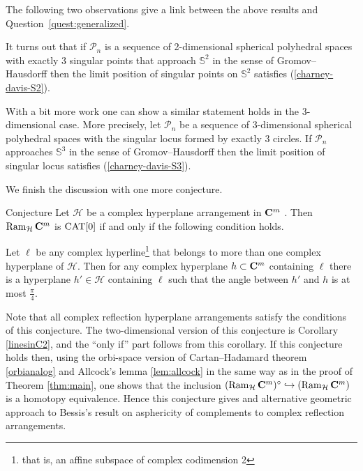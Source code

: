 \documentclass{compositio}
\begin{document}
The following two observations give a link between the above results and Question~\ref{quest:generalized}.

It turns out that if $\mathcal{P}_n$ is a sequence of 2-dimensional spherical polyhedral spaces with exactly 3 singular points that approach $\mathbb{S}^2$ in the sense of Gromov--Hausdorff then
the limit position of singular points on $\mathbb{S}^2$ satisfies (\ref{charney-davis-S2}).

With a bit more work one can show a similar statement holds in the 3-dimensional case.
More precisely, let $\mathcal{P}_n$ be a sequence of 3-dimensional spherical polyhedral spaces with the singular locus formed by exactly 3 circles.
If $\mathcal{P}_n$ approaches $\mathbb{S}^3$ in the sense of Gromov--Hausdorff then the limit position of singular locus  satisfies (\ref{charney-davis-S3}).

We finish the discussion with one more conjecture.

\begin{thm}{Conjecture} Let $\mathcal H$ be
a complex hyperplane arrangement in $\mathbf{C}^m$ . Then  $\mathop{\rm Ram}\nolimits_{\mathcal H} \mathbf{C}^m$ is $\mathrm{CAT}[0]$
if and only if the following condition holds.

Let $\ell$ be any complex hyperline\footnote{that is, an affine subspace of complex codimension 2}
that belongs to more than one complex hyperplane of $\mathcal H$.
Then for any complex hyperplane $h\subset \mathbf{C}^m$ containing $\ell$ there is a hyperplane
$h'\in \mathcal H$ containing $\ell$ such that the angle between
$h'$ and $h$ is at most $\frac{\pi}{4}$.
\end{thm}

Note that all complex reflection hyperplane arrangements satisfy the conditions of this conjecture.
The two-dimensional version of this conjecture is Corollary \ref{linesinC2},
and the ``only if'' part follows from this corollary.
If this conjecture holds then, using the orbi-space version of Cartan--Hadamard theorem \ref{orbianalog}
and Allcock's lemma \ref{lem:allcock} in the same way as in the proof of Theorem \ref{thm:main},
one shows that the inclusion
$(\mathop{\rm Ram}\nolimits_{\mathcal H}\mathbf{C}^m)^\circ\hookrightarrow(\mathop{\rm Ram}\nolimits_{\mathcal H}\mathbf{C}^m)$ is a homotopy equivalence.
Hence this conjecture gives and alternative geometric approach to Bessis's result  \cite{bessis} on asphericity of complements to complex reflection arrangements.
\end{document}
